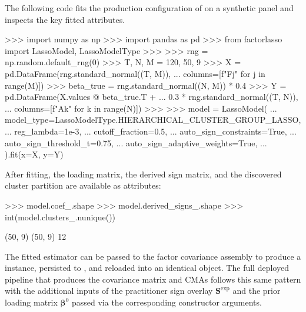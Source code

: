 \documentclass[article]{jss}
\begin{document}
The following code fits the production configuration of
 on a synthetic panel and inspects the key fitted
attributes.
%
\begin{CodeChunk}
\begin{CodeInput}
>>> import numpy as np
>>> import pandas as pd
>>> from factorlasso import LassoModel, LassoModelType
>>>
>>> rng = np.random.default_rng(0)
>>> T, N, M = 120, 50, 9
>>> X = pd.DataFrame(rng.standard_normal((T, M)),
...                  columns=[f"F{j}" for j in range(M)])
>>> beta_true = rng.standard_normal((N, M)) * 0.4
>>> Y = pd.DataFrame(X.values @ beta_true.T +
...                  0.3 * rng.standard_normal((T, N)),
...                  columns=[f"A{k}" for k in range(N)])
>>>
>>> model = LassoModel(
...     model_type=LassoModelType.HIERARCHICAL_CLUSTER_GROUP_LASSO,
...     reg_lambda=1e-3,
...     cutoff_fraction=0.5,
...     auto_sign_constraints=True,
...     auto_sign_threshold_t=0.75,
...     auto_sign_adaptive_weights=True,
... ).fit(x=X, y=Y)
\end{CodeInput}
\end{CodeChunk}
%
After fitting, the loading matrix, the derived sign matrix, and the
discovered cluster partition are available as attributes:
%
\begin{CodeChunk}
\begin{CodeInput}
>>> model.coef_.shape
>>> model.derived_signs_.shape
>>> int(model.clusters_.nunique())
\end{CodeInput}
\begin{CodeOutput}
(50, 9)
(50, 9)
12
\end{CodeOutput}
\end{CodeChunk}
%
\begin{sloppypar}
The fitted estimator can be passed to the factor covariance assembly
to produce a  instance, persisted to
, and reloaded into an identical object. The full
deployed pipeline that produces the covariance matrix and CMAs
follows this same pattern with the additional inputs of the practitioner
sign overlay $\bm{S}^{\mathrm{exp}}$ and the prior loading matrix
$\bm{\beta}^0$ passed via the corresponding constructor arguments.
\end{sloppypar}
\end{document}
